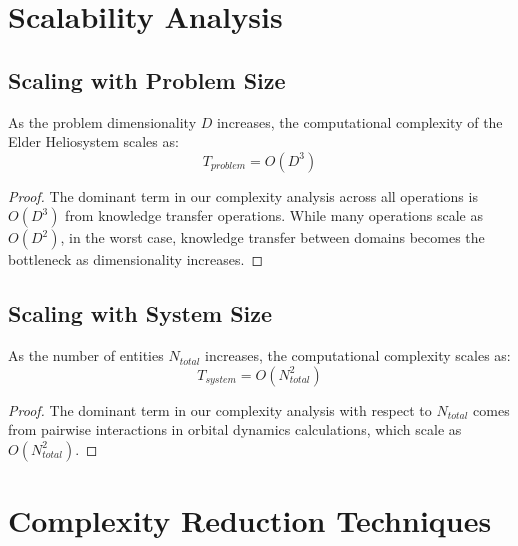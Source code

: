 \section{Scalability Analysis}



\subsection{Scaling with Problem Size}

\begin{theorem}
As the problem dimensionality $D$ increases, the computational complexity of the Elder Heliosystem scales as:
\begin{equation}
T_{problem} = O(D^3)
\end{equation}
\end{theorem}

\begin{proof}
The dominant term in our complexity analysis across all operations is $O(D^3)$ from knowledge transfer operations. While many operations scale as $O(D^2)$, in the worst case, knowledge transfer between domains becomes the bottleneck as dimensionality increases.
\end{proof}

\subsection{Scaling with System Size}

\begin{theorem}
As the number of entities $N_{total}$ increases, the computational complexity scales as:
\begin{equation}
T_{system} = O(N_{total}^2)
\end{equation}
\end{theorem}

\begin{proof}
The dominant term in our complexity analysis with respect to $N_{total}$ comes from pairwise interactions in orbital dynamics calculations, which scale as $O(N_{total}^2)$.
\end{proof}

\section{Complexity Reduction Techniques}

